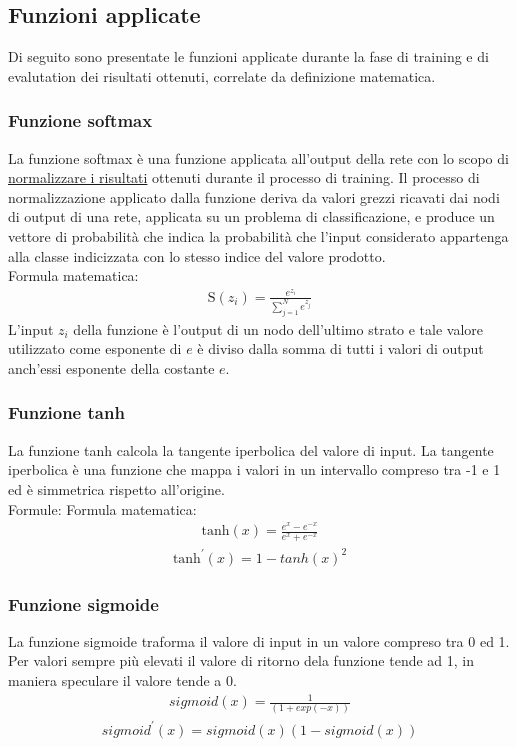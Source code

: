 \subsection{Funzioni applicate}
Di seguito sono presentate le funzioni applicate durante la fase di training e di evalutation dei risultati ottenuti, correlate da definizione matematica.
\subsubsection{Funzione softmax}
La funzione softmax è una funzione applicata all'output della rete con lo scopo di \underline{normalizzare i risultati} ottenuti durante il processo di training. Il processo di normalizzazione applicato dalla funzione deriva da valori grezzi ricavati dai nodi di output di una rete, applicata su un problema di classificazione, e produce un vettore di probabilità che indica la probabilità che l'input considerato appartenga alla classe indicizzata con lo stesso indice del valore prodotto. \\
Formula matematica:
\begin{align*}
\text{S}(z_i) = \frac{e^{z_i}}{\sum_{j=1}^{N} e^{z_j}}
\end{align*}
L'input $z_i$ della funzione è l'output di un nodo dell'ultimo strato e tale valore utilizzato come esponente di $e$ è diviso dalla somma di tutti i valori di output anch'essi esponente della costante $e$.
\subsubsection{Funzione tanh}
La funzione tanh calcola la tangente iperbolica del valore di input. La tangente iperbolica è una funzione che mappa i valori in un intervallo compreso tra -1 e 1 ed è simmetrica rispetto all'origine.\\
Formule:
Formula matematica:
\begin{align*}
\text{tanh}(x) = \frac{e^x - e^{-x}}{e^x + e^{-x}} 
\end{align*}
\begin{align*}
\text{tanh}^{\prime}(x) = 1 - tanh(x)^2
\end{align*}
\subsubsection{Funzione sigmoide}
La funzione sigmoide traforma il valore di input in un valore compreso tra 0 ed 1. Per valori sempre più elevati il valore di ritorno dela funzione tende ad 1, in maniera speculare il valore tende a 0.
\begin{align*}
sigmoid(x) = \frac{1}{(1 + exp(-x))}
\end{align*}
\begin{align*}
sigmoid^{\prime}(x) = sigmoid(x)(1 - sigmoid(x))
\end{align*}

